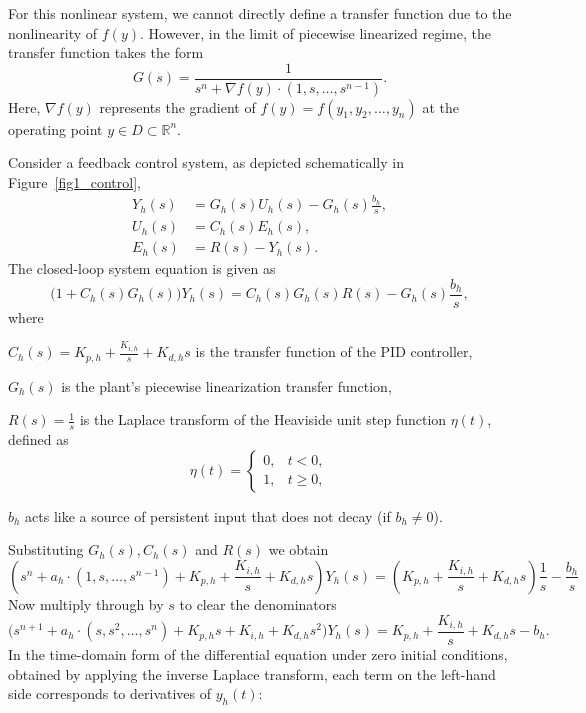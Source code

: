 \documentclass[preprint,12pt]{elsarticle}
\begin{document}
For this nonlinear system, we cannot directly define a transfer function due to the nonlinearity of \( f(y) \). However, in the limit of piecewise linearized regime, the transfer function takes the form
\begin{equation}\label{transfer:nonlinear}
G(s) = \frac{1}{s^n  + \nabla f(y) \cdot (1,s,\dots,s^{n-1})}.
\end{equation}
Here, \( \nabla f(y) \) represents the gradient of \( f(y)=f(y_1,y_2,\dots,y_n) \) at the operating point $y\in D\subset\mathbb{R}^n$.

Consider a feedback control system, as depicted schematically in Figure~\ref{fig1_control}, 
\[
\begin{aligned}
    Y_h(s) &= G_h(s) U_h(s) - G_h(s) \frac{b_h}{s}, \\
    U_h(s) &= C_h(s) E_h(s), \\
    E_h(s) &= R(s) - Y_h(s).
\end{aligned}
\]
The closed-loop system equation is given as
\[
\big(1 + C_h(s) G_h(s)\big) Y_h(s) = C_h(s)G_h(s) R(s) - G_h(s) \frac{b_h}{s},
\]
where

\( C_h(s) = K_{p,h} + \frac{K_{i,h}}{s} + K_{d,h} s \) is the transfer function of the PID controller,

\( G_h(s) \) is the plant's piecewise linearization transfer function,

\( R(s) = \frac{1}{s} \) is the Laplace transform of the Heaviside unit step function \( \eta(t) \), defined as 
\[
\eta(t) = 
\begin{cases}
	0, & t < 0, \\
	1, & t \ge 0,
\end{cases} 
\]

\( b_h \) acts like a source of persistent input that does not decay (if \( b_h \neq 0 \)).

Substituting \( G_h(s), C_h(s) \) and $R(s)$ we obtain
\[
\left(s^n  + a_h \cdot (1,s,\dots,s^{n-1})+K_{p,h} + \frac{K_{i,h}}{s} + K_{d,h} s\right)Y_h(s)
= \left(K_{p,h} + \frac{K_{i,h}}{s} + K_{d,h} s\right)\frac1s-\frac{b_h}{s}
\]
Now multiply through by \( s \) to clear the denominators
\[
\big(s^{n+1} +  a_h \cdot (s, s^2, \dots, s^{n}) +  K_{p,h}s + K_{i,h} +  K_{d,h}s^2\big) Y_h(s)
=K_{p,h} + \frac{K_{i,h}}{s} +  K_{d,h}s - b_h.
\]
In the time-domain form of the differential equation under zero initial conditions, obtained by applying the inverse Laplace transform, each term on the left-hand side corresponds to derivatives of \(y_h(t)\):
\end{document}
